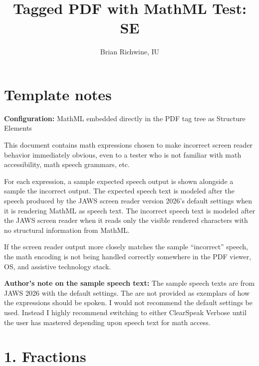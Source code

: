 \documentclass{article}
\title{Tagged PDF with MathML Test: SE}
\author{Brian Richwine, IU}
\date{}
\begin{document}
\raggedright

\maketitle

\section*{Template notes}

\textbf{Configuration:} MathML embedded directly in the PDF tag tree as Structure Elements


This document contains math expressions chosen to make incorrect screen 
reader behavior immediately obvious, even to a tester who is not familiar 
with math accessibility, math speech grammars, etc. 

For each expression, a sample expected speech output is shown alongside 
a sample the incorrect output. The expected speech text is modeled after 
the speech produced by the JAWS screen reader version 2026's default 
settings when it is rendering MathML as speech text. The incorrect speech 
text is modeled after the JAWS screen reader when it reads only the visible 
rendered characters with no structural information from MathML. 

If the screen reader output more closely matches the sample ``incorrect'' 
speech, the math encoding is not being handled correctly somewhere in 
the PDF viewer, OS, and assistive technology stack. 

\textbf{Author's note on the sample speech text:} The sample speech texts 
are from JAWS 2026 with the default settings. The are not provided as 
exemplars of how the expressions should be spoken. I would not recommend 
the default settings be used. Instead I highly recommend switching to 
either ClearSpeak Verbose until the user has mastered depending upon speech 
text for math access. 

\section*{1. Fractions}
\end{document}

